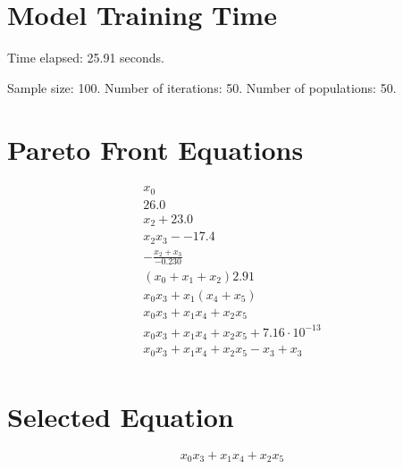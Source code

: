 \documentclass{article}
\begin{document}
\section*{Model Training Time}
Time elapsed: 25.91 seconds.

Sample size: 100.
Number of iterations: 50.
Number of populations: 50.

\section*{Pareto Front Equations}
\begin{align*}
x_{0} \\
26.0 \\
x_{2} + 23.0 \\
x_{2} x_{3} - -17.4 \\
- \frac{x_{2} + x_{3}}{-0.230} \\
\left(x_{0} + x_{1} + x_{2}\right) 2.91 \\
x_{0} x_{3} + x_{1} \left(x_{4} + x_{5}\right) \\
x_{0} x_{3} + x_{1} x_{4} + x_{2} x_{5} \\
x_{0} x_{3} + x_{1} x_{4} + x_{2} x_{5} + 7.16 \cdot 10^{-13} \\
x_{0} x_{3} + x_{1} x_{4} + x_{2} x_{5} - x_{3} + x_{3} \\
\end{align*}

\section*{Selected Equation}
\[ x_{0} x_{3} + x_{1} x_{4} + x_{2} x_{5} \]
\end{document}
